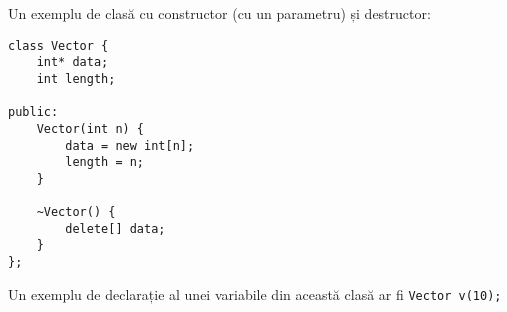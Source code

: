Un exemplu de clasă cu constructor (cu un parametru) și destructor:
\begin{lstlisting}
class Vector {
    int* data;
    int length;

public:
    Vector(int n) {
        data = new int[n];
        length = n;
    }

    ~Vector() {
        delete[] data;
    }
};
\end{lstlisting}
Un exemplu de declarație al unei variabile din această clasă ar fi \texttt{Vector v(10);}